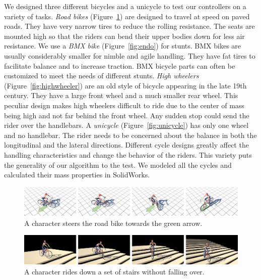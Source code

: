 We designed three different bicycles and a unicycle to test our controllers on a variety of tasks. \emph{Road bikes} (Figure~\ref{fig:balance}) are designed to travel at speed on paved roads. They have very narrow tires to reduce the rolling resistance. The seats are mounted high so that the riders can bend their upper bodies down for less air resistance. We use a \emph{BMX bike} (Figure~\ref{fig:endo}) for stunts. BMX bikes are usually considerably smaller for nimble and agile handling. They have fat tires to facilitate balance and to increase traction. BMX bicycle parts can often be customized to meet the needs of different stunts. \emph{High wheelers} (Figure~\ref{fig:highwheeler}) are an old style of bicycle appearing in the late 19th century. They have a large front wheel and a much smaller rear wheel. This peculiar design makes high wheelers difficult to ride due to the center of mass being high and not far behind the front wheel. Any sudden stop could send the rider over the handlebars. A \emph{unicycle} (Figure~\ref{fig:unicycle}) has only one wheel and no handlebar. The rider needs to be concerned about the balance in both the longitudinal and the lateral directions. Different cycle designs greatly affect the handling characteristics and change the behavior of the riders. This variety puts the generality of our algorithm to the test. We modeled all the cycles and calculated their mass properties in SolidWorks.

\begin{figure}[!t]
\centering
\includegraphics[width=\textwidth]{figures/maneuver}
\caption{A character steers the road bike towards the green arrow.}
\label{fig:balance}
\end{figure}

\begin{figure}[!t]
\centering
\includegraphics[width=\textwidth]{figures/staircase}
\caption{A character rides down a set of stairs without falling over.}
\label{fig:stair}
\end{figure}


